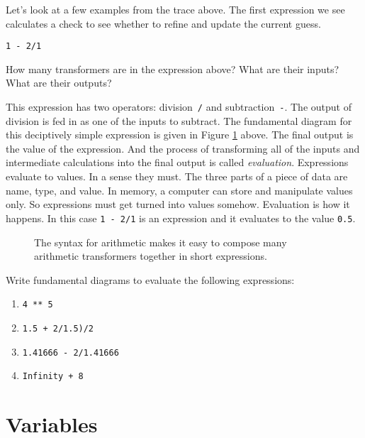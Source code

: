 Let's look at a few examples from the trace above. The first expression we see calculates a check to see whether to refine and update the current guess.

\begin{center}
  \texttt{1 - 2/1}
\end{center}

\begin{question}
  How many transformers are in the expression above? What are their inputs? What are their outputs?
\end{question}

This expression has two operators: division~\texttt{/} and subtraction~\texttt{-}. The output of division is fed in as one of the inputs to subtract. The fundamental diagram for this deciptively simple expression is given in Figure \ref{fig:intro-expression-fundamental-diagram} above. The final output is the value of the expression. And the process of transforming all of the inputs and intermediate calculations into the final output is called \emph{evaluation}. Expressions evaluate to values. In a sense they must. The three parts of a piece of data are name, type, and value. In memory, a computer can store and manipulate values only. So expressions must get turned into values somehow. Evaluation is how it happens. In this case \texttt{1 - 2/1} is an expression and it evaluates to the value \texttt{0.5}.

\begin{figure}
  
  \caption{\label{fig:intro-expression-fundamental-diagram} The syntax for arithmetic makes it easy to compose many arithmetic transformers together in short expressions.}
\end{figure}

\begin{question}
  Write fundamental diagrams to evaluate the following expressions:
  \begin{enumerate}
    \item \texttt{4 ** 5}
    \item \texttt{1.5 + 2/1.5)/2}
    \item \texttt{1.41666 - 2/1.41666}
    \item \texttt{Infinity + 8}
  \end{enumerate}
\end{question}

\section{Variables}

